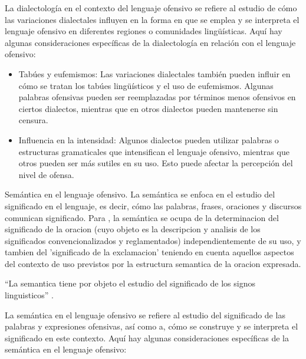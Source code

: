La dialectología en el contexto del lenguaje ofensivo se refiere al estudio de cómo las variaciones dialectales influyen en la forma en que se emplea y se interpreta el lenguaje ofensivo en diferentes regiones o comunidades lingüísticas. Aquí hay algunas consideraciones específicas de la dialectología en relación con el lenguaje ofensivo:

\begin{itemize}
			\item Tabúes y eufemismos: Las variaciones dialectales también pueden influir en cómo se tratan los tabúes lingüísticos y el uso de eufemismos. Algunas palabras ofensivas pueden ser reemplazadas por términos menos ofensivos en ciertos dialectos, mientras que en otros dialectos pueden mantenerse sin censura.
			
			\item Influencia en la intensidad: Algunos dialectos pueden utilizar palabras o estructuras gramaticales que intensifican el lenguaje ofensivo, mientras que otros pueden ser más sutiles en su uso. Esto puede afectar la percepción del nivel de ofensa.

\end{itemize}

Semántica en el lenguaje ofensivo. La semántica se enfoca en el estudio del significado en el lenguaje, es decir, cómo las palabras, frases, oraciones y discursos comunican significado. Para , la semántica se ocupa de la determinacion del significado de la oracion (cuyo objeto es la descripcion y analisis de los significados convencionalizados y reglamentados) independientemente de su uso, y tambien del 'significado de la exclamacion' teniendo en cuenta aquellos aspectos del contexto de uso previstos por la estructura semantica de la oracion expresada.

``La semantica tiene por objeto el estudio del significado de los signos linguisticos'' \cite[p. 36]{prado2004analisis} .

La semántica en el lenguaje ofensivo se refiere al estudio del significado de las palabras y expresiones ofensivas, así como a, cómo se construye y se interpreta el significado en este contexto. Aquí hay algunas consideraciones específicas de la semántica en el lenguaje ofensivo:

